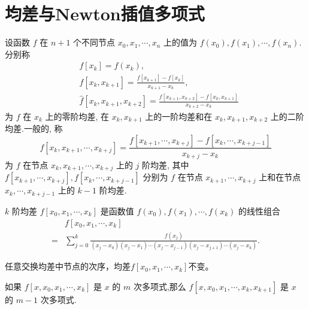 \section{均差与Newton插值多项式}
设函数 $f$ 在 $n+1$ 个不同节点 $x_0, x_1, \cdots, x_n$ 上的值为 $f\left(x_0\right), f\left(x_1\right), \cdots, f\left(x_n\right)$.分别称
$$
    \begin{aligned}
         & f\left[x_k\right]=f\left(x_k\right),                                                                                    \\
         & f\left[x_k, x_{k+1}\right]=\frac{f\left[x_{k+1}\right]-f\left[x_k\right]}{x_{k+1}-x_k},                                 \\
         & \hat{f}\left[x_k, x_{k+1}, x_{k+2}\right]=\frac{f\left[x_{k+1}, x_{k+2}\right]-f\left[x_k, x_{k+1}\right]}{x_{k+2}-x_k}
    \end{aligned}
$$
为 $f$ 在 $x_k$ 上的零阶均差, 在 $x_k, x_{k+1}$ 上的一阶均差和在 $x_k, x_{k+1}, x_{k+2}$ 上的二阶均差.一般的, 称
$$
    f\left[x_k, x_{k+1}, \cdots, x_{k+j}\right]=\frac{f\left[x_{k+1}, \cdots, x_{k+j}\right]-f\left[x_k, \cdots, x_{k+j-1}\right]}{x_{k+j}-x_k}
$$
为 $f$ 在节点 $x_k, x_{k+1}, \cdots, x_{k+j}$ 上的 $j$ 阶均差, 其中 $f\left[x_{k+1}, \cdots, x_{k+j}\right], f\left[x_k, \cdots, x_{k+j-1}\right]$ 分别为 $f$ 在节点 $x_{k+1}, \cdots, x_{k+j}$ 上和在节点 $x_k, \cdots, x_{k+j-1}$ 上的 $k-1$ 阶均差.
\begin{proposition}
    $k$ 阶均差 $f\left[x_0, x_1, \cdots, x_k\right]$ 是函数值 $f\left(x_0\right), f\left(x_1\right), \cdots, f\left(x_k\right)$ 的线性组合
    $$
        \begin{aligned}
              & f\left[x_0, x_1, \cdots, x_k\right]                                                                                                                                 \\
            = & \sum_{j=0}^k \frac{f\left(x_j\right)}{\left(x_j-x_0\right)\left(x_j-x_1\right) \cdots\left(x_j-x_{j-1}\right)\left(x_j-x_{j+1}\right) \cdots\left(x_j-x_k\right)} .
        \end{aligned}
    $$
\end{proposition}
\begin{proposition}[对称性]
    任意交换均差中节点的次序，均差$f\left[x_0, x_1, \cdots, x_k\right]$不变。
\end{proposition}
\begin{proposition}
    如果 $f\left[x, x_0, x_1, \cdots, x_k\right]$ 是 $x$ 的 $m$ 次多项式,那么 $f\left[x, x_0, x_1, \cdots, x_k, x_{k+1}\right]$ 是 $x$ 的 $m-1$ 次多项式.
\end{proposition}

